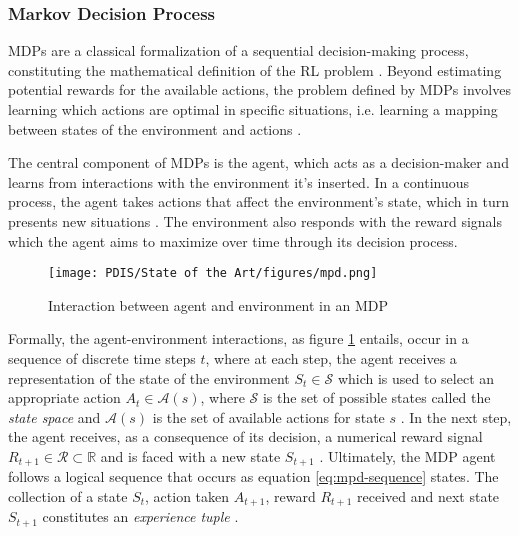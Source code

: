 \documentclass[11pt,a4paper]{article}
\begin{document}
\subsubsection{Markov Decision Process} \label{section:mpd}
\acfp{MDP} are a classical formalization of a sequential decision-making process, constituting the mathematical definition of the \ac{RL} problem \cite{suttonReinforcementLearningIntroduction2014, moralesGrokkingDeepReinforcement2020}. Beyond estimating potential rewards for the available actions, the problem defined by \acp{MDP} involves learning which actions are optimal in specific situations, i.e. learning a mapping between states of the environment and actions \cite{suttonReinforcementLearningIntroduction2014}. 

The central component of \acp{MDP} is the agent, which acts as a decision-maker and learns from interactions with the environment it's inserted. In a continuous process, the agent takes actions that affect the environment's state, which in turn presents new situations \cite{suttonReinforcementLearningIntroduction2014}. The environment also responds with the reward signals which the agent aims to maximize over time through its decision process.

\begin{figure}
    \centering
    \texttt{[image: PDIS/State of the Art/figures/mpd.png]}
    \caption{Interaction between agent and environment in an \ac{MDP} \cite{suttonReinforcementLearningIntroduction2014}}
    \label{fig:mpd-interaction}
\end{figure}

Formally, the agent-environment interactions, as figure \ref{fig:mpd-interaction} entails, occur in a sequence of discrete time steps $t$, where at each step, the agent receives a representation of the state of the environment $S_t \in \mathcal{S}$ which is used to select an appropriate action $A_t \in \mathcal{A}(s)$, where $\mathcal{S}$ is the set of possible states called the \textit{state space} and $\mathcal{A}(s)$ is the set of available actions for state $s$ \cite{suttonReinforcementLearningIntroduction2014, moralesGrokkingDeepReinforcement2020}. In the next step, the agent receives, as a consequence of its decision, a numerical reward signal $R_{t+1} \in \mathcal{R} \subset \mathbb{R}$ and is faced with a new state $S_{t +1}$ \cite{suttonReinforcementLearningIntroduction2014}. Ultimately, the MDP agent follows a logical sequence that occurs as equation \ref{eq:mpd-sequence} states. The collection of a state $S_t$, action taken $A_{t+1}$, reward $R_{t+1}$ received and next state $S_{t+1}$ constitutes an \textit{experience tuple} \cite{moralesGrokkingDeepReinforcement2020}.
\end{document}
